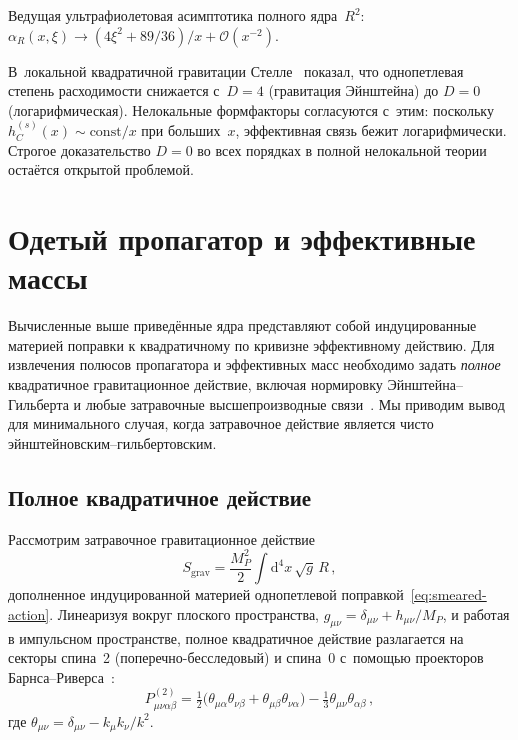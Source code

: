 \documentclass[aps,prd,twocolumn,superscriptaddress,nofootinbib,floatfix]{revtex4-2}
\theoremstyle{definition}
\theoremstyle{remark}
\newcommand{\dd}{\mathrm{d}}
\begin{document}
Ведущая ультрафиолетовая асимптотика полного ядра~$R^2$:
$\alpha_R(x,\xi) \to (4\xi^2 + 89/36)/x + \mathcal{O}(x^{-2})$.

В~локальной квадратичной гравитации Стелле~\cite{Stelle:1976gc} показал,
что однопетлевая степень расходимости снижается с~$D = 4$ (гравитация
Эйнштейна) до $D = 0$ (логарифмическая). Нелокальные формфакторы
согласуются с~этим: поскольку $h_C^{(s)}(x) \sim \text{const}/x$ при
больших~$x$, эффективная связь бежит логарифмически. Строгое доказательство
$D = 0$ во всех порядках в полной нелокальной теории остаётся открытой
проблемой.


\section{Одетый пропагатор и эффективные массы}
\label{sec:propagator}

Вычисленные выше приведённые ядра представляют собой индуцированные
материей поправки к квадратичному по кривизне эффективному действию. Для
извлечения полюсов пропагатора и эффективных масс необходимо задать
\emph{полное} квадратичное гравитационное действие, включая нормировку
Эйнштейна--Гильберта и любые затравочные высшепроизводные
связи~\cite{Stelle:1976gc,Stelle:1977ry,Buchbinder:1992rb}. Мы приводим
вывод для минимального случая, когда затравочное действие является чисто
эйнштейновским--гильбертовским.

\subsection{Полное квадратичное действие}

Рассмотрим затравочное гравитационное действие
\begin{equation}
  S_{\text{grav}} = \frac{M_P^2}{2}\int \dd^4x\,\sqrt{g}\,R\,,
  \label{eq:EH}
\end{equation}
дополненное индуцированной материей однопетлевой
поправкой~\eqref{eq:smeared-action}. Линеаризуя вокруг плоского
пространства, $g_{\mu\nu} = \delta_{\mu\nu} + h_{\mu\nu}/M_P$, и работая
в импульсном пространстве, полное квадратичное действие разлагается на
секторы спина~2 (поперечно-бесследовый) и спина~0 с~помощью проекторов
Барнса--Риверса~\cite{Barnes:1965,Rivers:1964}:
\begin{equation}
  P^{(2)}_{\mu\nu\alpha\beta} = \tfrac{1}{2}\bigl(
    \theta_{\mu\alpha}\theta_{\nu\beta} + \theta_{\mu\beta}\theta_{\nu\alpha}
  \bigr) - \tfrac{1}{3}\theta_{\mu\nu}\theta_{\alpha\beta}\,,
  \label{eq:BR-P2}
\end{equation}
где $\theta_{\mu\nu} = \delta_{\mu\nu} - k_\mu k_\nu/k^2$.
\end{document}
